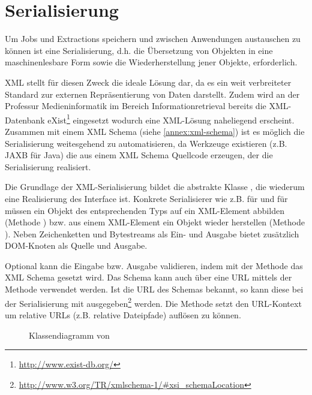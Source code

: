 \section{Serialisierung}
Um Jobs und Extractions speichern und zwischen Anwendungen austauschen zu können ist eine Serialisierung, d.h. die Übersetzung von Objekten in eine maschinenlesbare Form sowie die Wiederherstellung jener Objekte, erforderlich.

XML stellt für diesen Zweck die ideale Lösung dar, da es ein weit verbreiteter Standard zur externen Repräsentierung von Daten darstellt.
Zudem wird an der Professur Medieninformatik im Bereich Informationretrieval bereits die XML-Datenbank eXist\footnote{\url{http://www.exist-db.org/}} eingesetzt wodurch eine XML-Lösung naheliegend erscheint.
Zusammen mit einem XML Schema (siehe \autoref{annex:xml-schema}) ist es möglich die Serialisierung weitesgehend zu automatisieren, da Werkzeuge existieren (z.B. JAXB für Java) die aus einem XML Schema Quellcode erzeugen, der die Serialisierung realisiert.

Die Grundlage der XML-Serialisierung bildet die abstrakte Klasse , die wiederum eine Realisierung des Interface  ist.
Konkrete Serialisierer wie z.B.  für  und  für  müssen ein Objekt des entsprechenden Typs auf ein XML-Element abbilden (Methode ) bzw. aus einem XML-Element ein Objekt wieder herstellen (Methode ).
Neben Zeichenketten und Bytestreams als Ein- und Ausgabe bietet  zusätzlich DOM-Knoten als Quelle und Ausgabe.

Optional kann  die Eingabe bzw. Ausgabe validieren, indem mit der Methode  das XML Schema gesetzt wird.
Das Schema kann auch über eine URL mittels der Methode  verwendet werden.
Ist die URL des Schemas bekannt, so kann diese bei der Serialisierung mit ausgegeben\footnote{\url{http://www.w3.org/TR/xmlschema-1/\#xsi_schemaLocation}} werden.
Die Methode  setzt den URL-Kontext um relative URLs (z.B. relative Dateipfade) auflösen zu können.

\begin{figure}[h]
  \centering
  \caption{Klassendiagramm von }
\end{figure}

